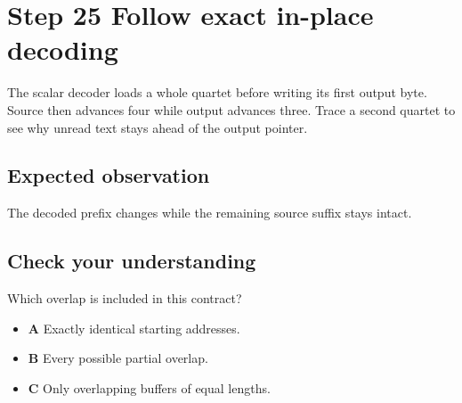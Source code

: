 \section{Step 25 Follow exact in-place decoding}\label{base64-s25}

The scalar decoder loads a whole quartet before writing its first output byte. Source then advances four while output advances three. Trace a second quartet to see why unread text stays ahead of the output pointer.

\subsection{Expected observation}
The decoded prefix changes while the remaining source suffix stays intact.

\subsection{Check your understanding}
Which overlap is included in this contract?

\begin{itemize}
\item \textbf{A} Exactly identical starting addresses.
\item \textbf{B} Every possible partial overlap.
\item \textbf{C} Only overlapping buffers of equal lengths.
\end{itemize}
